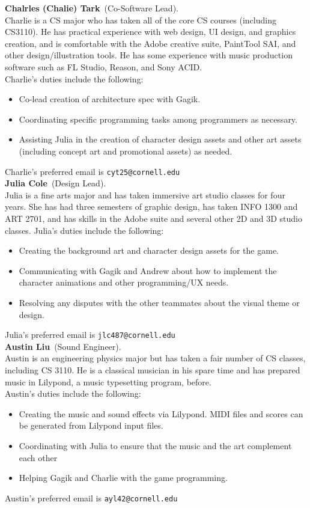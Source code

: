 \documentclass[letterpaper,11pt]{texMemo}
\newcommand{\teammember}[2]{ \textbf{#1}\ (#2).\ }
\newenvironment{duties}[1]
               {
                 #1's duties include the following:
                 \begin{itemize}
               }
               {
                 \end{itemize}
               }
\newcommand{\preferredemail}[2]{#1's preferred email is \texttt{#2}\\}
\begin{document}
\teammember{Chalrles (Chalie) Tark}{Co-Software Lead}\\
Charlie is a CS major who has taken all of the core CS courses 
(including CS3110).  He has practical experience with web design, UI design, 
and graphics creation, and is comfortable with the Adobe creative suite, 
PaintTool SAI, and other design/illustration tools.  He has some experience 
with music production software such as FL Studio, Reason, and Sony ACID.\\
\begin{duties}{Charlie}
\item{Co-lead creation of architecture spec with Gagik}.
\item{Coordinating specific programming tasks among programmers as necessary.}
\item{Assisting Julia in the creation of  character design assets and other 
art assets (including concept art and promotional assets) as needed.}
\end{duties}
\preferredemail{Charlie}{cyt25@cornell.edu}

\teammember{Julia Cole}{Design Lead}\\Julia is a fine arts major and has taken 
immersive art studio classes for four years. She has had three semesters of 
graphic design, has taken INFO 1300 and ART 2701, and has skills in the 
Adobe suite and several other 2D and 3D studio classes.
\begin{duties}{Julia}
\item{Creating the background art and character design assets for the game.}
\item{Communicating with Gagik and Andrew about how to implement the character animations and other programming/UX needs.}
\item{Resolving any disputes with the other teammates about the visual theme or design.}
\end{duties}
\preferredemail{Julia}{jlc487@cornell.edu}

\teammember{Austin Liu}{Sound Engineer}\\
Austin is an engineering physics major but has taken a fair number of CS 
classes, including CS 3110. He is a classical
musician in his spare time and has prepared music in Lilypond, a music
typesetting program, before. \\
\begin{duties}{Austin}
\item Creating the music and sound effects via Lilypond.
  MIDI files and scores can be generated from Lilypond input files.
\item Coordinating with Julia to ensure that the music and the art complement
  each other
\item Helping Gagik and Charlie with the game programming.
\end{duties}
\preferredemail{Austin}{ayl42@cornell.edu}
\end{document}
